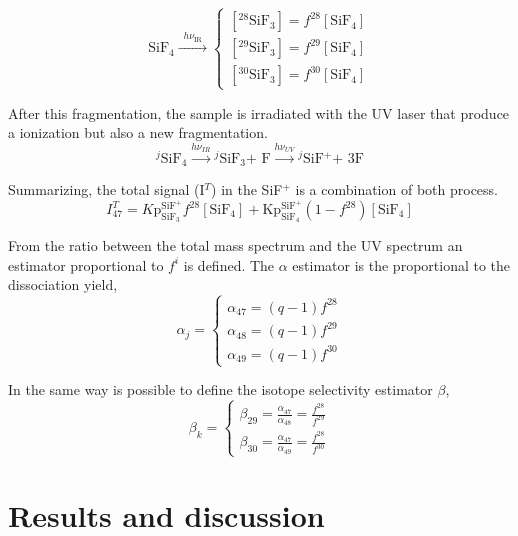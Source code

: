 \documentclass[global,twocolumn]{svjour}
\begin{document}
\begin{equation}
\text{SiF$_{4}$} \xrightarrow{\,\,\, h\nu_{\text{IR}} \,\,\,}
\begin{cases}
[^{28}\text{SiF$_{3}$}] = f^{28}[\text{SiF$_{4}$} ] \\
[^{29}\text{SiF$_{3}$}] = f^{29}[\text{SiF$_{4}$} ] \\
[^{30}\text{SiF$_{3}$}] = f^{30}[\text{SiF$_{4}$} ]
\end{cases}
\end{equation}

After this fragmentation, the sample is irradiated with the UV laser that produce a ionization but also a new fragmentation. 
\begin{equation}
\text{$^{j}$SiF$_{4}$} \xrightarrow{h \nu_{IR}} \text{$^{j}$SiF$_{3}$+ F} \xrightarrow{h \nu_{UV}} \text{$^{j}$SiF$^{+}$+ 3F}  
\end{equation}

Summarizing, the total signal (I$^{T}$) in the SiF$^{+}$ is a combination of both process.
\begin{equation}
I_{47}^{T} = K \text{p}_{\text{SiF$_{3}$}}^{\text{SiF$^{+}$}} f^{28}[\text{SiF$_{4}$}] + \text{K} \text{p}_{\text{SiF$_{4}$}}^{\text{SiF$^{+}$}} (1-f^{28})[\text{SiF$_{4}$}]
\end{equation}

From the ratio between the total mass spectrum and the UV spectrum an estimator proportional to $f^{i}$ is defined. The $\alpha$ estimator is the proportional to the dissociation yield,
\begin{equation}
\alpha_{j} = 
\begin{cases}
\alpha_{47} = (q-1)f^{28} \\
\alpha_{48} = (q-1)f^{29} \\
\alpha_{49} = (q-1)f^{30}
\end{cases}
\end{equation}

In the same way is possible to define the isotope selectivity estimator $\beta$,
\begin{equation}
\beta_{k} = 
\begin{cases}
\beta_{29} = \frac{\alpha_{47}}{\alpha_{48}} = \frac{f^{28}}{f^{29}} \\
\beta_{30} = \frac{\alpha_{47}}{\alpha_{49}} = \frac{f^{28}}{f^{30}}
\end{cases}
\end{equation}

\section{Results and discussion}
\end{document}

